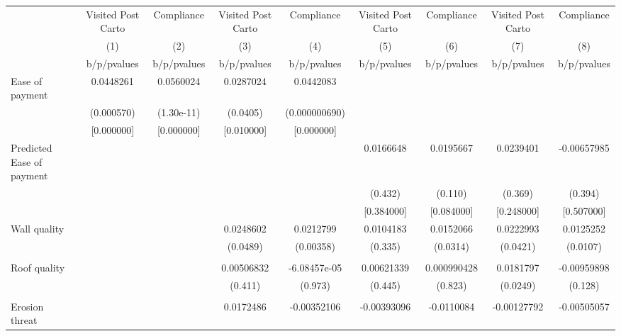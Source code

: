 {
\def\sym#1{\ifmmode^{#1}\else\(^{#1}\)\fi}
\begin{tabular}{l*{8}{c}}
\toprule
                &\multicolumn{1}{c}{Visited Post Carto}&\multicolumn{1}{c}{Compliance}&\multicolumn{1}{c}{Visited Post Carto}&\multicolumn{1}{c}{Compliance}&\multicolumn{1}{c}{Visited Post Carto}&\multicolumn{1}{c}{Compliance}&\multicolumn{1}{c}{Visited Post Carto}&\multicolumn{1}{c}{Compliance}\\
                &\multicolumn{1}{c}{(1)}&\multicolumn{1}{c}{(2)}&\multicolumn{1}{c}{(3)}&\multicolumn{1}{c}{(4)}&\multicolumn{1}{c}{(5)}&\multicolumn{1}{c}{(6)}&\multicolumn{1}{c}{(7)}&\multicolumn{1}{c}{(8)}\\
                &b/p/pvalues&b/p/pvalues&b/p/pvalues&b/p/pvalues&b/p/pvalues&b/p/pvalues&b/p/pvalues&b/p/pvalues\\
\midrule
Ease of payment &0.0448261&0.0560024&0.0287024&0.0442083&         &         &         &         \\
                &(0.000570)&(1.30e-11)& (0.0405)&(0.000000690)&         &         &         &         \\
                &[0.000000]&[0.000000]&[0.010000]&[0.000000]&         &         &         &         \\
Predicted Ease of payment&         &         &         &         &0.0166648&0.0195667&0.0239401&-0.00657985\\
                &         &         &         &         &  (0.432)&  (0.110)&  (0.369)&  (0.394)\\
                &         &         &         &         &[0.384000]&[0.084000]&[0.248000]&[0.507000]\\
Wall quality    &         &         &0.0248602&0.0212799&0.0104183&0.0152066&0.0222993&0.0125252\\
                &         &         & (0.0489)&(0.00358)&  (0.335)& (0.0314)& (0.0421)& (0.0107)\\
                &         &         &         &         &         &         &         &         \\
Roof quality    &         &         &0.00506832&-6.08457e-05&0.00621339&0.000990428&0.0181797&-0.00959898\\
                &         &         &  (0.411)&  (0.973)&  (0.445)&  (0.823)& (0.0249)&  (0.128)\\
                &         &         &         &         &         &         &         &         \\
Erosion threat  &         &         &0.0172486&-0.00352106&-0.00393096&-0.0110084&-0.00127792&-0.00505057\\

\end{tabular}}
